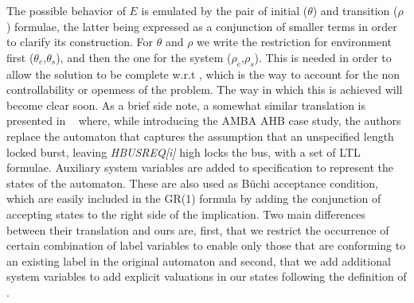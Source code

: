 The possible behavior of $E$ is emulated by the pair of initial ($\theta$) and transition ($\rho$) formulae, the latter being expressed as a conjunction of smaller terms in order to clarify its construction. For $\theta$ and $\rho$ we write the restriction for environment first ($\theta_e$,$\theta_s$), and then the one for the system ($\rho_e$,$\rho_s$).  This is needed in order to allow the solution to be complete w.r.t \gsX, which is the way to account for the non controllability or openness of the problem.  The way in which this is achieved will become clear soon.  
As a brief side note, a somewhat similar translation is presented in ~\cite{bloem2012synthesis} where, while introducing the AMBA AHB case study, the authors replace the automaton that captures the assumption that an unspecified length locked burst, leaving \emph{HBUSREQ[i]} high locks the bus, with a set of LTL formulae. Auxiliary system variables are added to specification to represent the states of the automaton. These are also used as Büchi acceptance condition, which are easily included in the GR(1) formula by adding the conjunction of accepting states to the right side of the implication.
Two main differences between their translation and ours are, first,  that we restrict the occurrence of certain combination of label variables to enable only those that are conforming to an existing label in the original automaton and second, that we add additional system variables to add explicit valuations in our states following the definition of \valuations.


